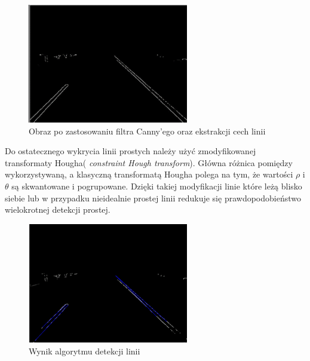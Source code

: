\begin{figure}
  \centering
  \includegraphics[width=7cm]{img/canny.png}
  \caption{Obraz po zastosowaniu filtra Canny'ego oraz ekstrakcji cech linii\cite{T3}}
  \label{fig:canny}
\end{figure}

Do ostatecznego wykrycia linii prostych należy użyć zmodyfikowanej transformaty Hougha( \textit{constraint Hough transform}). 
Główna różnica pomiędzy wykorzystywaną, a klasyczną transformatą Hougha polega na tym, że wartości $\rho$ i $\theta$ są skwantowane i pogrupowane. 
Dzięki takiej modyfikacji linie które leżą blisko siebie lub w przypadku nieidealnie prostej linii redukuje się prawdopodobieństwo wielokrotnej detekcji prostej. %

\begin{figure}
  \centering
  \includegraphics[width=7cm]{img/prehough.png}
  \caption{Wynik algorytmu detekcji linii\cite{T3}}
  \label{fig:result}
\end{figure}



